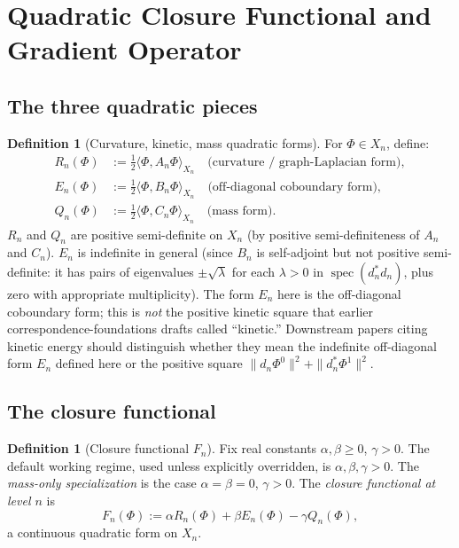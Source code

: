 \documentclass[11pt, a4paper]{amsart}
\theoremstyle{definition}
\newtheorem{definition}[theorem]{Definition}
\newcommand{\spec}{\operatorname{spec}}
\begin{document}
\section{Quadratic Closure Functional and Gradient Operator}
\label{sec:quadratic}

\subsection{The three quadratic pieces}

\begin{definition}[Curvature, kinetic, mass quadratic forms]
\label{def:RnEnQn}
For $\Phi \in X_n$, define:
\begin{align*}
  R_n(\Phi) &:= \tfrac{1}{2} \langle \Phi, A_n \Phi \rangle_{X_n}
    \quad \text{(curvature / graph-Laplacian form)}, \\
  E_n(\Phi) &:= \tfrac{1}{2} \langle \Phi, B_n \Phi \rangle_{X_n}
    \quad \text{(off-diagonal coboundary form)}, \\
  Q_n(\Phi) &:= \tfrac{1}{2} \langle \Phi, C_n \Phi \rangle_{X_n}
    \quad \text{(mass form)}.
\end{align*}
$R_n$ and $Q_n$ are positive semi-definite on $X_n$ (by
positive semi-definiteness of $A_n$ and $C_n$). $E_n$ is
indefinite in general (since $B_n$ is self-adjoint but not
positive semi-definite: it has pairs of eigenvalues
$\pm\sqrt{\lambda}$ for each $\lambda > 0$ in
$\spec(d_n^* d_n)$, plus zero with appropriate multiplicity).
The form $E_n$ here is the off-diagonal coboundary form; this
is \emph{not} the positive kinetic square that earlier
correspondence-foundations drafts called ``kinetic.'' Downstream
papers citing kinetic energy should distinguish whether they
mean the indefinite off-diagonal form $E_n$ defined here or the
positive square $\|d_n \Phi^0\|^2 + \|d_n^* \Phi^1\|^2$.
\end{definition}

\subsection{The closure functional}

\begin{definition}[Closure functional $F_n$]
\label{def:Fn}
Fix real constants $\alpha, \beta \geq 0$, $\gamma > 0$. The
default working regime, used unless explicitly overridden, is
$\alpha, \beta, \gamma > 0$. The \emph{mass-only specialization}
is the case $\alpha = \beta = 0$, $\gamma > 0$. The
\emph{closure functional at level $n$} is
\[
  F_n(\Phi) := \alpha R_n(\Phi) + \beta E_n(\Phi) - \gamma Q_n(\Phi),
\]
a continuous quadratic form on $X_n$.
\end{definition}
\end{document}

